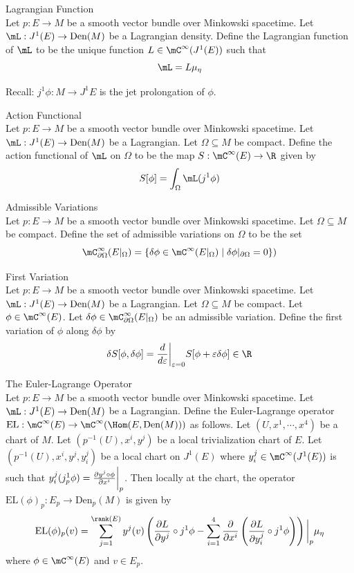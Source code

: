 \documentclass[a4paper]{article}
\begin{document}
\begin{defn}{Lagrangian Function}{}\\
Let $p:E\to M$ be a smooth vector bundle over Minkowski spacetime. Let $\mL:J^1(E)\to\text{Den}(M)$ be a Lagrangian density. Define the Lagrangian function of $\mL$ to be the unique function $L\in\mC^\infty(J^1(E))$ such that $$\mL=L\mu_\eta$$
\end{defn}

Recall: $j^1\phi:M\to J^1E$ is the jet prolongation of $\phi$. 

\begin{defn}{Action Functional}{}\\
Let $p:E\to M$ be a smooth vector bundle over Minkowski spacetime. Let $\mL:J^1(E)\to\text{Den}(M)$ be a Lagrangian. Let $\Omega\subseteq M$ be compact. Define the action functional of $\mL$ on $\Omega$ to be the map $S:\mC^\infty(E)\to\R$ given by $$S[\phi]=\int_\Omega\mL(j^1\phi)$$
\end{defn}

\begin{defn}{Admissible Variations}{}\\
Let $p:E\to M$ be a smooth vector bundle over Minkowski spacetime. Let $\Omega\subseteq M$ be compact. Define the set of admissible variations on $\Omega$ to be the set $$\mC^\infty_{\partial\Omega}(E|_\Omega)=\{\delta\phi\in\mC^\infty(E|_\Omega)\;|\;\delta\phi|_{\partial\Omega}=0\})$$
\end{defn}

\begin{defn}{First Variation}{}\\
Let $p:E\to M$ be a smooth vector bundle over Minkowski spacetime. Let $\mL:J^1(E)\to\text{Den}(M)$ be a Lagrangian. Let $\Omega\subseteq M$ be compact. Let $\phi\in\mC^\infty(E)$. Let $\delta\phi\in\mC^\infty_{\partial\Omega}(E|_{\Omega})$ be an admissible variation. Define the first variation of $\phi$ along $\delta\phi$ by $$\delta S[\phi,\delta\phi]=\frac{d}{d\varepsilon}\bigg{|}_{\varepsilon=0}S[\phi+\varepsilon\delta\phi]\in\R$$
\end{defn}

\begin{defn}{The Euler-Lagrange Operator}{}\\
Let $p:E\to M$ be a smooth vector bundle over Minkowski spacetime. Let $\mL:J^1(E)\to\text{Den}(M)$ be a Lagrangian. Define the Euler-Lagrange operator $\text{EL}:\mC^\infty(E)\to\mC^\infty(\Hom(E,\text{Den}(M)))$ as follows. Let $(U,x^1,\cdots,x^4)$ be a chart of $M$. Let $(p^{-1}(U),x^i,y^j)$ be a local trivialization chart of $E$. Let $(p^{-1}(U),x^i,y^j,y_i^j)$ be a local chart on $J^1(E)$ where $y_i^j\in\mC^\infty(J^1(E))$ is such that $y_i^j(j_p^1\phi)=\frac{\partial y^j\circ\phi}{\partial x^i}\bigg{|}_p$. Then locally at the chart, the operator $\text{EL}(\phi)_p:E_p\to\text{Den}_p(M)$ is given by $$\text{EL}(\phi)_p(v)=\sum_{j=1}^{\rank(E)}y^j(v)\left(\frac{\partial L}{\partial y^j}\circ j^1\phi-\sum_{i=1}^4\frac{\partial}{\partial x^i}\left(\frac{\partial L}{\partial y_i^j}\circ j^1\phi\right)\right)\bigg{|}_p\mu_\eta$$ where $\phi\in\mC^\infty(E)$ and $v\in E_p$. 
\end{defn}
\end{document}
